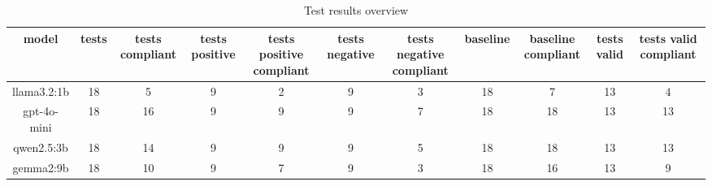 
  \begin{table}[h!]
  \centering
  \begin{tabular}{|c|c|c|c|c|c|c|c|c|c|c|}
  \hline
  model & tests & tests compliant & tests positive & tests positive compliant & tests negative & tests negative compliant & baseline & baseline compliant & tests valid & tests valid compliant \\
  \hline
  llama3.2:1b & 18 & 5 & 9 & 2 & 9 & 3 & 18 & 7 & 13 & 4\\
\hline
gpt-4o-mini & 18 & 16 & 9 & 9 & 9 & 7 & 18 & 18 & 13 & 13\\
\hline
qwen2.5:3b & 18 & 14 & 9 & 9 & 9 & 5 & 18 & 18 & 13 & 13\\
\hline
gemma2:9b & 18 & 10 & 9 & 7 & 9 & 3 & 18 & 16 & 13 & 9
  \end{tabular}
  \caption{Test results overview}
  
  \end{table}
  